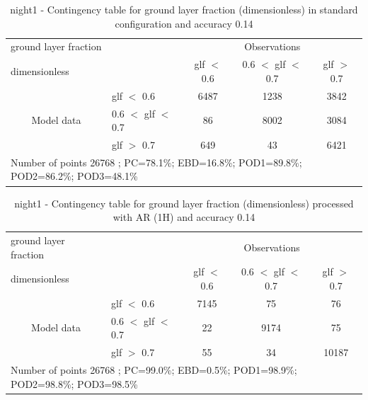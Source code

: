 \begin{table}[p!]
\begin{center}
\begin{tabular}{llccc}
\hline
{ground layer fraction}                                       &                                                    & \multicolumn{3}{c}{Observations}                 \\
{dimensionless}                                       &                             & glf $<$ 0.6   & 0.6 $<$ glf $<$ 0.7 & glf $>$ 0.7 \\
\hline
\multicolumn{1}{c}{\multirow{3}{*}{Model data}}  & glf $<$ 0.6             & 6487                & 1238                       & 3842              \\
                                                 & 0.6  $<$ glf $<$ 0.7 & 86                & 8002                       & 3084              \\
                                                 & glf $>$ 0.7             & 649                & 43                       & 6421              \\
\hline
\multicolumn{5}{l}{ Number of points        26768 ; PC=78.1\%; EBD=16.8\%; POD1=89.8\%; POD2=86.2\%; POD3=48.1\%}
\end{tabular}
\end{center}
\caption{night1 - Contingency table for  ground layer fraction (dimensionless) in standard configuration and accuracy 0.14}
\label{tab:contingencyglfBEF:night1}
\end{table}
\begin{table}[p!]
\begin{center}
\begin{tabular}{llccc}
\hline
{ground layer fraction}                                       &                                                    & \multicolumn{3}{c}{Observations}                 \\
{dimensionless}                                       &                             & glf $<$ 0.6   & 0.6 $<$ glf $<$ 0.7 & glf $>$ 0.7 \\
\hline
\multicolumn{1}{c}{\multirow{3}{*}{Model data}}  & glf $<$ 0.6             & 7145                & 75                       & 76              \\
                                                 & 0.6  $<$ glf $<$ 0.7 & 22                & 9174                       & 75              \\
                                                 & glf $>$ 0.7             & 55                & 34                       & 10187              \\
\hline
\multicolumn{5}{l}{ Number of points        26768 ; PC=99.0\%; EBD=0.5\%; POD1=98.9\%; POD2=98.8\%; POD3=98.5\%}
\end{tabular}
\end{center}
\caption{night1 - Contingency table for  ground layer fraction (dimensionless) processed with AR (1H) and accuracy 0.14}
\label{tab:contingencyglfAFT:night1}
\end{table}

